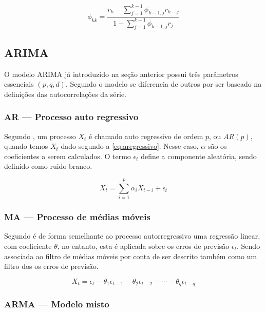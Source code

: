\documentclass[
    12pt,
    oneside,
    a4paper,
    english,
    brazil
]{abntex2}
\begin{document}
\begin{equation}
    \label{eq:facp}
    \phi_{kk} = \frac{r_k-\sum_{j=1}^{k-1}{\phi_{k-1,j}r_{k-j}}}{1-\sum_{j=1}^{k-1}{\phi_{k-1,j}r_{j}}}
\end{equation}

\subsection{ARIMA}

O  modelo  ARIMA  já  introduzido  na seção  anterior  possui  três  parâmetros
essenciais $(p,q,d)$. Segundo  o modelo se diferencia de outros
por ser baseado na definições das autocorrelações da série.

\subsubsection{AR --- Processo auto regressivo}

Segundo  ,  um  processo  $X_t$ é  chamado  auto  regressivo
de   ordem   $p$,   ou   $AR(p)$,   quando   temos   $X_t$   dado   segundo   a
\autoref{eq:aregressivo}.  Nesse caso,  $\alpha$  são os  coeficientes a  serem
calculados. O termo $\epsilon_t$ define  a componente aleatória, sendo definido
como ruido branco.

\begin{equation}
    \label{eq:aregressivo}
    X_t = \sum_{i = 1}^{p}{\alpha_{i}X_{t-i}} + \epsilon_t
\end{equation}

\subsubsection{MA --- Processo de médias móveis}

Segundo  é de forma  semelhante ao processo autorregressivo uma
regressão linear, com  coeficiente $\theta$, no entanto, esta  é aplicada sobre
os erros de  previsão $\epsilon_t$. Sendo associada ao filtro  de médias móveis
por conta de ser descrito também como um filtro dos os erros de previsão.

\begin{equation}
    \label{eq:pmediasmoveis}
    X_t = \epsilon_t - \theta_1\epsilon_{t-1} - \theta_2\epsilon_{t-2} - \cdots - \theta_{q}\epsilon_{t-q}
\end{equation}

\subsubsection{ARMA --- Modelo misto}
\end{document}
